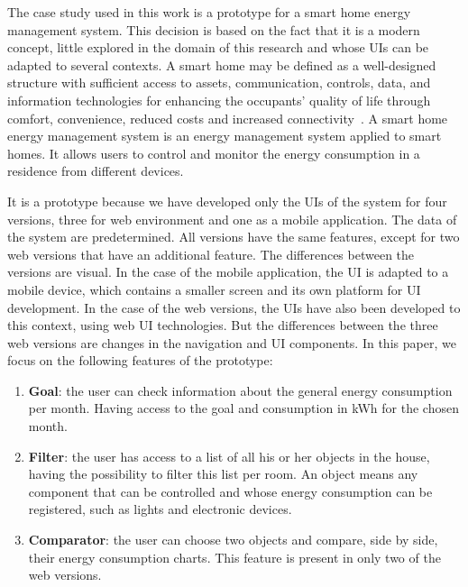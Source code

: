 \documentclass{chi-ext}
\begin{document}
The case study used in this work is a prototype for a smart home energy management system. This decision is based on the fact that it is a modern concept, little explored in the domain of this research and whose UIs can be adapted to several contexts. A smart home may be defined as a well-designed structure with sufficient access to assets, communication, controls, data, and information technologies for enhancing the occupants' quality of life through comfort, convenience, reduced costs and increased connectivity~\cite{smart-home-harper}. A smart home energy management system is an energy management system applied to smart homes. It allows users to control and monitor the energy consumption in a residence from different devices. 

It is a prototype because we have developed only the UIs of the system for four versions, three for web environment and one as a mobile application. The data of the system are predetermined. All versions have the same features, except for two web versions that have an additional feature. The differences between the versions are visual. In the case of the mobile application, the UI is adapted to a mobile device, which contains a smaller screen and its own platform for UI development. In the case of the web versions, the UIs have also been developed to this context, using web UI technologies. But the differences between the three web versions are changes in the navigation and UI components. In this paper, we focus on the following features of the prototype:

\begin{enumerate}

\item \textbf{Goal}: the user can check information about the general energy consumption per month. Having access to the goal and consumption in kWh for the chosen month. 

\item \textbf{Filter}: the user has access to a list of all his or her objects in the house, having the possibility to filter this list per room. An object means any component that can be controlled and whose energy consumption can be registered, such as lights and electronic devices.

\item \textbf{Comparator}: the user can choose two objects and compare, side by side, their energy consumption charts. This feature is present in only two of the web versions.

\end{enumerate} 
\end{document}
